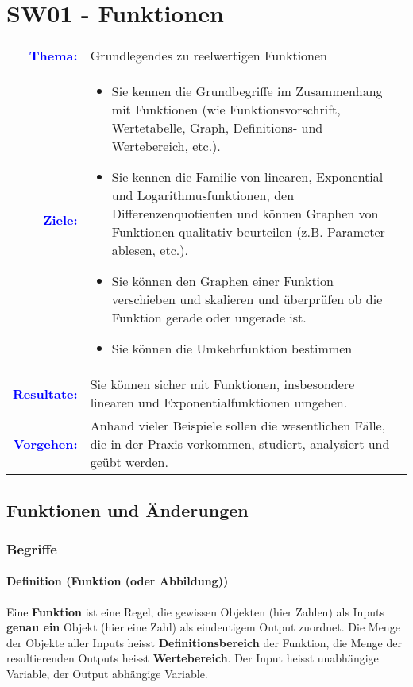 \section{SW01 - Funktionen}
\begin{tabularx}{\textwidth}{|rX|}
    \hline
        \textbf{\textcolor{blue}{Thema:}}&Grundlegendes zu reelwertigen Funktionen\\
        \textbf{\textcolor{blue}{Ziele:}}&\vspace{-4mm}\begin{itemize}
            \item Sie kennen die Grundbegriffe im Zusammenhang mit Funktionen (wie Funktionsvorschrift, Wertetabelle, Graph, Definitions- und Wertebereich, etc.).
            \item Sie kennen die Familie von linearen, Exponential- und Logarithmusfunktionen, den Differenzenquotienten und können Graphen von Funktionen qualitativ beurteilen (z.B. Parameter ablesen, etc.).
            \item Sie können den Graphen einer Funktion verschieben und skalieren und überprüfen ob die Funktion gerade oder ungerade ist.
            \item Sie können die Umkehrfunktion bestimmen
        \end{itemize}\\
        \textbf{\textcolor{blue}{Resultate:}}&Sie können sicher mit Funktionen, insbesondere linearen und Exponentialfunktionen umgehen.\\
        \textbf{\textcolor{blue}{Vorgehen:}}&Anhand vieler Beispiele sollen die wesentlichen Fälle, die in der Praxis vorkommen, studiert, analysiert und geübt werden.\\
    \hline
\end{tabularx}

\subsection{Funktionen und Änderungen}
\subsubsection{Begriffe}
\paragraph{Definition (Funktion (oder Abbildung))}
Eine \textbf{Funktion} ist eine Regel, die gewissen Objekten (hier Zahlen) als Inputs \textbf{genau ein} Objekt (hier eine Zahl) als eindeutigem Output zuordnet. Die Menge der Objekte aller Inputs heisst \textbf{Definitionsbereich} der Funktion, die Menge der resultierenden Outputs heisst \textbf{Wertebereich}. Der Input heisst unabhängige Variable, der Output abhängige Variable.
